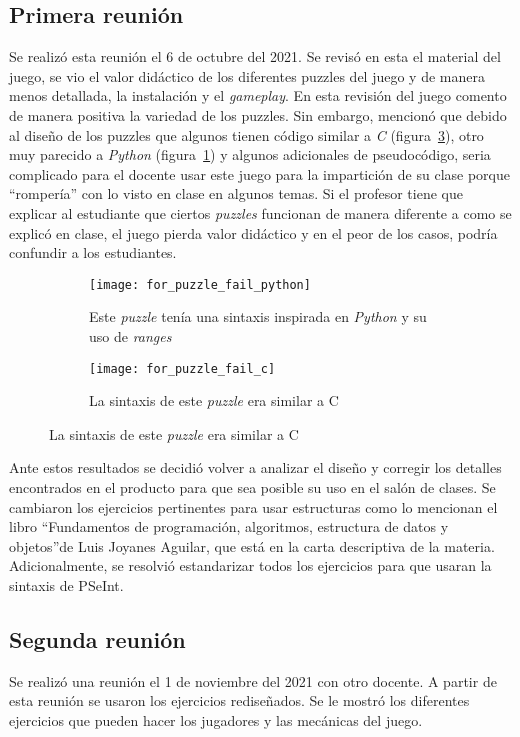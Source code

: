\subsection{Primera reunión}
Se realizó esta reunión el 6 de octubre del 2021. Se revisó en esta el material del juego, se vio el valor didáctico de los diferentes puzzles del juego y de manera menos detallada, la instalación y el \textit{gameplay}. En esta revisión del juego comento de manera positiva la variedad de los puzzles. Sin embargo, mencionó que debido al diseño de los puzzles que algunos tienen código similar a \textit{C} (figura~\ref{fig:for_puzzle_fail_c}), otro muy parecido a \textit{Python} (figura~\ref{fig:for_puzzle_fail_python}) y algunos adicionales de pseudocódigo, seria complicado para el docente usar este juego para la impartición de su clase porque ``rompería'' con lo visto en clase en algunos temas. Si el profesor tiene que explicar al estudiante que ciertos \textit{puzzles} funcionan de manera diferente a como se explicó en clase, el juego pierda valor didáctico y en el peor de los casos, podría confundir a los estudiantes.
\begin{figure}
    \centering
    \begin{subfigure}{0.4\textwidth}
         \centering
         \texttt{[image: for\_puzzle\_fail\_python]}
         \caption{Este \textit{puzzle} tenía una sintaxis inspirada en \textit{Python} y su uso de \textit{ranges}}
         \label{fig:for_puzzle_fail_python}
     \end{subfigure}
         \begin{subfigure}{0.4\textwidth}
         \centering
         \texttt{[image: for\_puzzle\_fail\_c]}
         \caption{La sintaxis de este \textit{puzzle} era similar a C}
         \label{fig:for_puzzle_fail_c}
     \end{subfigure}
\end{figure}

Ante estos resultados se decidió volver a analizar el diseño y corregir los detalles encontrados en el producto para que sea posible su uso en el salón de clases. Se cambiaron los ejercicios pertinentes para usar estructuras como lo mencionan el libro \textquotedblleft Fundamentos de programación, algoritmos, estructura de datos y objetos\textquotedblright de Luis Joyanes Aguilar, que está en la carta descriptiva de la materia. Adicionalmente, se resolvió estandarizar todos los ejercicios para que usaran la sintaxis de PSeInt. 

\subsection{Segunda reunión}
Se realizó una reunión el 1 de noviembre del 2021 con otro docente. A partir de esta reunión se usaron los ejercicios rediseñados. Se le mostró los diferentes ejercicios que pueden hacer los jugadores y las mecánicas del juego.

